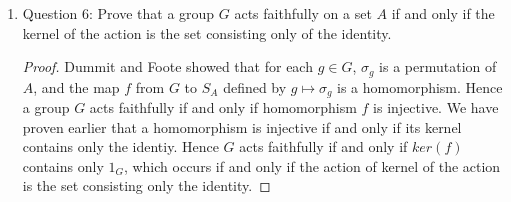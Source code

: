 \documentclass{article}
\begin{document}
\begin{enumerate}
\begin{enumerate}
\begin{proof}
          Now we show that the stabilizer of $a$ in $G$ is a subgroup of
          $G$. Let $g_1,g_2\in G$ be in the stabilizer. It suffices to show
          that $g_1g_2^{-1}$ is also in the stabilizer. Now
          \begin{align*}
            g_2^{-1}\cdot a & = \sigma_{g_2^{-1}}(a) & \\
                            & = \sigma_{g_2}^{-1}(a) & (\because\,\text{the
            map from $G$ to $S_ A$ is a homomorphism}) \\
                            & = a, & (\because\,\sigma_{g_2}(a)=a)
          \end{align*}
          implying that $g_2^{-1}$ is also in the stabilizer. Then
          \begin{align*}
            (g_1g_2^{-1})\cdot a  & = g_1\cdot(g_2^{-1}\cdot a)  &
              (\text{by group action rules}) \\
                                  & = g_1\cdot(a) & (\because
                                  g_2^{-1}\,\text{is in the stabilizer}) \\
                                  & = a           & (\because a\,\text{is
                                  in the stabilizer}) \\
          \end{align*}
          Hence $g_1g_2^{-1}$ is also in the stabilizer, as we are required
          to show. \\
        \end{proof}

      \item Question 6: Prove that a group $G$ acts faithfully on a set $A$
        if and only if the kernel of the action is the set consisting only
        of the identity.

        \begin{proof}
          Dummit and Foote showed that for each $g\in G$, $\sigma_g$ is a
          permutation of $A$, and the map $f$ from $G$ to $S_A$ defined by
          $g\mapsto\sigma_g$ is a homomorphism. Hence a group $G$ acts
          faithfully if and only if homomorphism $f$ is injective. We have
          proven earlier that a homomorphism is injective if and only
          if its kernel contains only the identiy. Hence $G$ acts
          faithfully if and only if $ker(f)$ contains only $1_G$, which
          occurs if and only if the action of kernel of the action is the
          set consisting only the identity.
        \end{proof}


\end{enumerate}
\end{enumerate}
\end{document}
